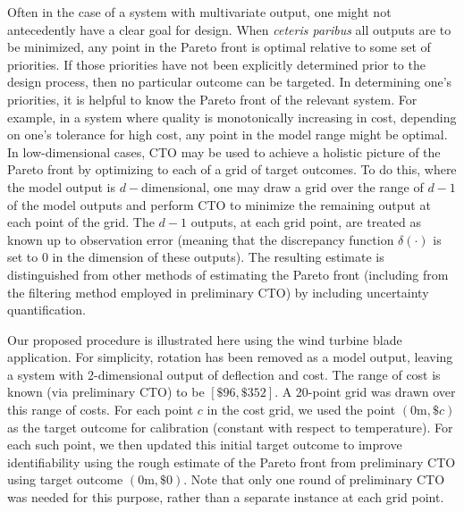 \documentclass[12pt]{article}
\begin{document}
Often in the case of a system with multivariate output, one might not antecedently have a clear goal for design.
%
When \textit{ceteris paribus} all outputs are to be minimized, any point in the Pareto front is optimal relative to some set of priorities.
%
If those priorities have not been explicitly determined prior to the design process, then no particular outcome can be targeted.
%
In determining one's priorities, it is helpful to know the Pareto front of the relevant system.
%
For example, in a system where quality is monotonically increasing in cost, depending on one's tolerance for high cost, any point in the model range might be optimal.
%
%
In low-dimensional cases, CTO may be used to achieve a holistic picture of the Pareto front by optimizing to each of a grid of target outcomes.
%
To do this, where the model output is $d-$dimensional, one may draw a grid over the range of $d-1$ of the model outputs and perform CTO to minimize the remaining output at each point of the grid.
%
The $d-1$ outputs, at each grid point, are treated as known up to observation error (meaning that the discrepancy function $\delta(\cdot)$ is set to 0 in the dimension of these outputs).
%
The resulting estimate is distinguished from other methods of estimating the Pareto front (including from the filtering method employed in preliminary CTO) by including uncertainty quantification.
%

Our proposed procedure is illustrated here using the wind turbine blade application.
%
For simplicity, rotation has been removed as a model output, leaving a system with 2-dimensional output of deflection and cost. 
%
The range of cost is known (via preliminary CTO) to be $[\$96,\$352]$.
%
A 20-point grid was drawn over this range of costs. 
%
%
For each point $c$ in the cost grid, we used the point $(0\mathrm m,\$c)$ as the target outcome for calibration (constant with respect to temperature).
%
For each such point, we then updated this initial target outcome to improve identifiability using the rough estimate of the Pareto front from preliminary CTO using target outcome $(0\mathrm m,\$0)$.
%
Note that only one round of preliminary CTO was needed for this purpose, rather than a separate instance at each grid point.
%
\end{document}
